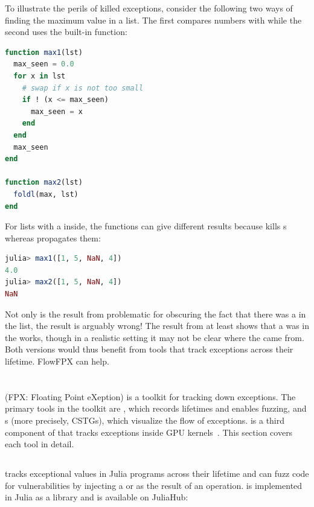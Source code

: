 \documentclass{juliacon}
\begin{document}
To illustrate the perils of killed exceptions, consider the following two ways
of finding the maximum value in a list.
The first compares numbers with \code{<=}
while the second uses the built-in  function:

\begin{lstlisting}[language = Julia]
function max1(lst)
  max_seen = 0.0
  for x in lst
    # swap if x is not too small
    if ! (x <= max_seen)
      max_seen = x
    end
  end
  max_seen
end

function max2(lst)
  foldl(max, lst)
end
\end{lstlisting}

For lists with a \Nan{} inside, the functions can give different
results because \code{<=} kills \Nan{}s whereas 
propagates them:

\begin{lstlisting}[language = Julia]
julia> max1([1, 5, NaN, 4]) 
4.0
julia> max2([1, 5, NaN, 4]) 
NaN
\end{lstlisting}

Not only is the result from  problematic for obscuring the fact that there was a \NaN{} in the list, the result is arguably wrong!
The result from  at least shows that a \Nan{} was in the works, though in a realistic setting it may not be clear where the \Nan{} came from.
Both versions would thus benefit from tools that track exceptions across their lifetime.
FlowFPX can help.

\section{\FlowFPX{}}
\label{s:flowfpx}

\FlowFPX{} (FPX: Floating Point eXeption) is a toolkit for tracking down \fp{} exceptions.
The primary tools in the \FlowFPX{} toolkit are \FT{}, which records lifetimes
and enables fuzzing, and \CSTG{}s (more precisely, CSTGs), which visualize
the flow of exceptions.
\GPUFPX{} is a third component of \FlowFPX{} that tracks \fp{} exceptions inside GPU kernels~\cite{llsflg-hpdc-2023}.
This section covers each tool in detail.

\subsection{\FT{}}
\label{s:floattracker}

\FT{} tracks exceptional values in Julia programs across
their \genpropkill{} lifetime and can fuzz code for vulnerabilities by
injecting a \Nan{} or \Inf{} as the result of an operation. \FT{} is
implemented in Julia as a library and is available on JuliaHub:
\end{document}
